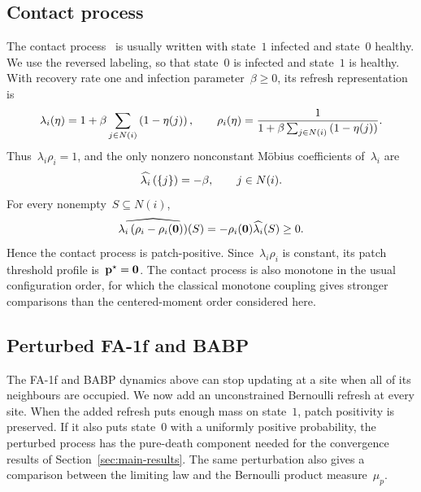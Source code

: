 \subsection{Contact process}
\label{subsec:contact-benchmark}

The contact process~\cite{Harris1974} is usually written with state~$1$
infected and state~$0$ healthy. We use the reversed labeling, so that state~$0$
is infected and state~$1$ is healthy. With recovery rate one and infection
parameter~$\beta\geq0$, its refresh representation is
\begin{equation*}
\lambda_i(\eta)
=
1+\beta\sum_{j\in N(i)}\left(1-\eta(j)\right),
\qquad
\rho_i(\eta)
=
\frac{1}{1+\beta\sum_{j\in N(i)}\left(1-\eta(j)\right)}.
\end{equation*}
Thus~$\lambda_i\rho_i=1$, and the only nonzero nonconstant M\"obius
coefficients of~$\lambda_i$ are
\begin{equation*}
\widehat{\lambda_i}\left(\left\{j\right\}\right)=-\beta,
\qquad j\in N(i).
\end{equation*}
For every nonempty~$S\subseteq N(i)$,
\begin{equation*}
\widehat{\lambda_i\left(\rho_i-\rho_i(\mathbf{0})\right)}(S)
=
-\rho_i(\mathbf{0})\widehat{\lambda_i}(S)
\geq0.
\end{equation*}
Hence the contact process is patch-positive. Since~$\lambda_i\rho_i$ is
constant, its patch threshold profile is~$\mathbf{p}^\star=\mathbf{0}$. The contact
process is also monotone in the usual configuration order, for which the
classical monotone coupling gives stronger comparisons than the centered-moment
order considered here.

%
%

\subsection{Perturbed FA-1f and BABP}
\label{subsec:fa-babp-consequences}

The FA-1f and BABP dynamics above can stop updating at a site when all of its
neighbours are occupied. We now add an unconstrained Bernoulli refresh at every
site. When the added refresh puts enough mass on state~$1$, patch positivity is
preserved. If it also puts state~$0$ with a uniformly positive probability, the
perturbed process has the pure-death component needed for the convergence
results of Section~\ref{sec:main-results}. The same perturbation also gives a
comparison between the limiting law and the Bernoulli product measure~$\mu_p$.

